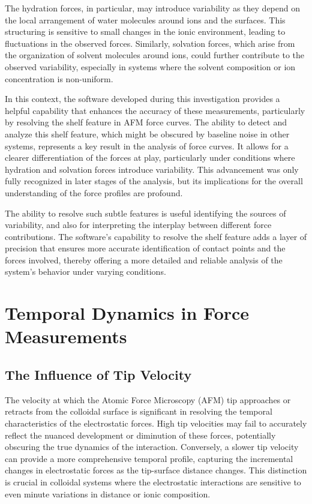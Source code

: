 The hydration forces, in particular, may introduce variability as they depend on the local arrangement of water molecules around ions and the surfaces. This structuring is sensitive to small changes in the ionic environment, leading to fluctuations in the observed forces. Similarly, solvation forces, which arise from the organization of solvent molecules around ions, could further contribute to the observed variability, especially in systems where the solvent composition or ion concentration is non-uniform. \cite{israelachvili2011intermolecular}

In this context, the software developed during this investigation provides a helpful capability that enhances the accuracy of these measurements, particularly by resolving the shelf feature in AFM force curves. The ability to detect and analyze this shelf feature, which might be obscured by baseline noise in other systems, represents a key result in the analysis of force curves. It allows for a clearer differentiation of the forces at play, particularly under conditions where hydration and solvation forces introduce variability. This advancement was only fully recognized in later stages of the analysis, but its implications for the overall understanding of the force profiles are profound.

The ability to resolve such subtle features is useful identifying the sources of variability, and also for interpreting the interplay between different force contributions. The software's capability to resolve the shelf feature adds a layer of precision that ensures more accurate identification of contact points and the forces involved, thereby offering a more detailed and reliable analysis of the system's behavior under varying conditions.

\section{Temporal Dynamics in Force Measurements}

\subsection{The Influence of Tip Velocity}
The velocity at which the Atomic Force Microscopy (AFM) tip approaches or retracts from the colloidal surface is significant in resolving the temporal characteristics of the electrostatic forces. High tip velocities may fail to accurately reflect the nuanced development or diminution of these forces, potentially obscuring the true dynamics of the interaction. Conversely, a slower tip velocity can provide a more comprehensive temporal profile, capturing the incremental changes in electrostatic forces as the tip-surface distance changes. This distinction is crucial in colloidal systems where the electrostatic interactions are sensitive to even minute variations in distance or ionic composition.

